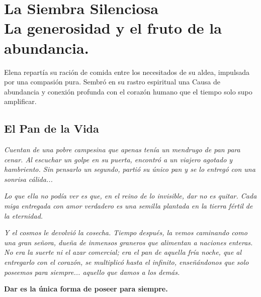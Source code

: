 \chapter[La Siembra Silenciosa]{La Siembra Silenciosa\\ \large La generosidad y el fruto de la abundancia.}


\lettrine[lines=3, nindent=0.5em, findent=0.2em]{E}{}lena repartía su ración de comida entre los necesitados de su aldea, impulsada por una compasión pura. Sembró en su rastro espiritual una Causa de abundancia y conexión profunda con el corazón humano que el tiempo solo supo amplificar.

\section{El Pan de la Vida}
\begin{elegantquote}
\textit{Cuentan de una pobre campesina que apenas tenía un mendrugo de pan para cenar. Al escuchar un golpe en su puerta, encontró a un viajero agotado y hambriento. Sin pensarlo un segundo, partió su único pan y se lo entregó con una sonrisa cálida...}

\textit{Lo que ella no podía ver es que, en el reino de lo invisible, dar no es quitar. Cada miga entregada con amor verdadero es una semilla plantada en la tierra fértil de la eternidad.}

\textit{Y el cosmos le devolvió la cosecha. Tiempo después, la vemos caminando como una gran señora, dueña de inmensos graneros que alimentan a naciones enteras. No era la suerte ni el azar comercial; era el pan de aquella fría noche, que al entregarlo con el corazón, se multiplicó hasta el infinito, enseñándonos que solo poseemos para siempre... aquello que damos a los demás.}

\end{elegantquote}

\vspace{1em}
\begin{center}
    \textbf{\Large Dar es la única forma de poseer para siempre.}
\end{center}
\vspace{1em}

